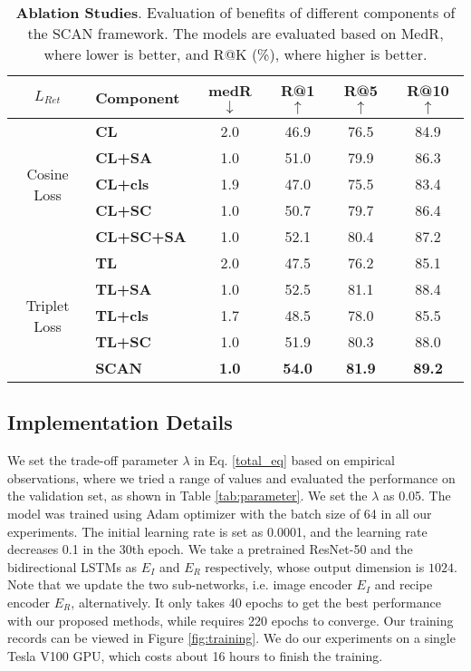 \documentclass[journal]{IEEEtran}
\begin{document}
\begin{table*}
  \centering
  \caption{\textbf{Ablation Studies}. Evaluation of benefits of different components of the SCAN framework. The models are evaluated based on MedR, where lower is better, and R@K (\%), where higher is better.}
  {
    \begin{tabular}{clcccc}
    \toprule
    \multicolumn{1}{c}{$L_{Ret}$} & \textbf{Component} & \textbf{medR $\downarrow$} & \textbf{R@1 $\uparrow$} &\textbf{R@5 $\uparrow$}& \textbf{R@10 $\uparrow$} \\
    \midrule
    \multirow{5}{*}{{Cosine Loss}}
    &\textbf{CL} & 2.0   & 46.9  & 76.5  & 84.9 \\
    &\textbf{CL+SA} & 1.0 & 51.0  & 79.9 & 86.3 \\
    \cline{2-6}
    &\textbf{CL+cls} & 1.9 & 47.0  & 75.5  & 83.4 \\
    &\textbf{CL+SC} & 1.0  & 50.7  & 79.7  & 86.4 \\
    \cline{2-6}
    &\textbf{CL+SC+SA} & 1.0  & 52.1  & 80.4  & 87.2 \\
    \midrule
    \multirow{5}{*}{{Triplet Loss}}
    &\textbf{TL} & 2.0   & 47.5  & 76.2  & 85.1 \\
    &\textbf{TL+SA} & 1.0   & 52.5  & 81.1 & 88.4 \\
    \cline{2-6}
    &\textbf{TL+cls} & 1.7 & 48.5  & 78.0  & 85.5 \\
    &\textbf{TL+SC} & 1.0  & 51.9  & 80.3  & 88.0 \\
    \cline{2-6}
    &\textbf{SCAN} & \textbf{1.0} & \textbf{54.0}  & \textbf{81.9}  & \textbf{89.2} \\
    \bottomrule
    \end{tabular}}
  \label{tab:ablation}\end{table*}

\subsection{Implementation Details}
We set the trade-off parameter $\lambda$ in Eq. \eqref{total_eq} based on empirical observations, where we tried a range of values and evaluated the performance on the validation set, as shown in Table \ref{tab:parameter}. We set the $\lambda$ as 0.05. The model was trained using Adam optimizer \cite{kingma2014adam} with the batch size of 64 in all our experiments. The initial learning rate is set as 0.0001, and the learning rate decreases 0.1 in the 30th epoch. We take a pretrained ResNet-50 and the bidirectional LSTMs as $E_I$ and $E_R$ respectively, whose output dimension is $1024$. Note that we update the two sub-networks, i.e. image encoder $E_I$ and recipe encoder $E_R$, alternatively. It only takes 40 epochs to get the best performance with our proposed methods, while \cite{salvador2017learning} requires 220 epochs to converge. Our training records can be viewed in Figure \ref{fig:training}. We do our experiments on a single Tesla V100 GPU, which costs about 16 hours to finish the training.
\end{document}
